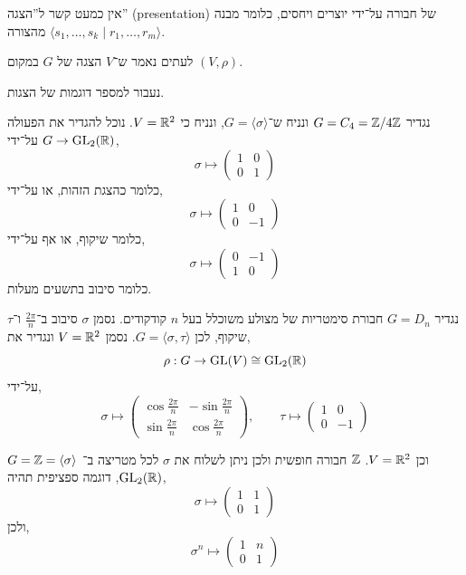 \begin{remark}
	אין כמעט קשר ל''הצגה'' (presentation) של חבורה על־ידי יוצרים ויחסים, כלומר מבנה מהצורה $\langle s_1, \ldots, s_k \mid r_1, \ldots, r_m \rangle$.
\end{remark}
\begin{remark}
	לעתים נאמר ש־$V$ הצגה של $G$ במקום $(V, \rho)$.
\end{remark}
נעבור למספר דוגמות של הצגות.
\begin{example}
	נגדיר $G = C_4 = \mathbb{Z} / 4 \mathbb{Z}$ ונניח ש־$G = \langle \sigma \rangle$, ונניח כי $V = \mathbb{R}^2$.
	נוכל להגדיר את הפעולה $G \to \operatorname{GL}_2(\mathbb{R})$ על־ידי,
	\[
		\sigma \mapsto
		\begin{pmatrix}
			1 & 0 \\
			0 & 1
		\end{pmatrix}
	\]
	כלומר כהצגת הזהות, או על־ידי,
	\[
		\sigma \mapsto
		\begin{pmatrix}
			1 & 0 \\
			0 & -1
		\end{pmatrix}
	\]
	כלומר שיקוף, או אף על־ידי,
	\[
		\sigma \mapsto
		\begin{pmatrix}
			0 & -1 \\
			1 & 0
		\end{pmatrix}
	\]
	כלומר סיבוב בתשעים מעלות.
\end{example}
\begin{example}
	נגדיר $G = D_n$ חבורת סימטריות של מצולע משוכלל בעל $n$ קודקודים.
	נסמן $\sigma$ סיבוב ב־$\frac{2 \pi}{n}$ ו־$\tau$ שיקוף, לכן $G = \langle \sigma, \tau \rangle$.
	נסמן $V = \mathbb{R}^2$ ונגדיר את,
	\[
		\rho : G \to \operatorname{GL}(V) \cong \operatorname{GL}_2(\mathbb{R})
	\]
	על־ידי,
	\[
		\sigma \mapsto
		\begin{pmatrix}
			\cos \frac{2 \pi}{n} & - \sin \frac{2 \pi}{n} \\
			\sin \frac{2 \pi}{n} & \cos \frac{2 \pi}{n}
		\end{pmatrix},
		\qquad
		\tau \mapsto
		\begin{pmatrix}
			1 & 0 \\
			0 & -1
		\end{pmatrix}
	\]
\end{example}
\begin{example}
	$G = \mathbb{Z} = \langle \sigma \rangle$ וכן $V = \mathbb{R}^2$.
	$\mathbb{Z}$ חבורה חופשית ולכן ניתן לשלוח את $\sigma$ לכל מטריצה ב־$\operatorname{GL}_2(\mathbb{R})$, דוגמה ספציפית תהיה,
	\[
		\sigma \mapsto
		\begin{pmatrix}
			1 & 1 \\
			0 & 1
		\end{pmatrix}
	\]
	ולכן,
	\[
		\sigma^n \mapsto
		\begin{pmatrix}
			1 & n \\
			0 & 1
		\end{pmatrix}
	\]
\end{example}
